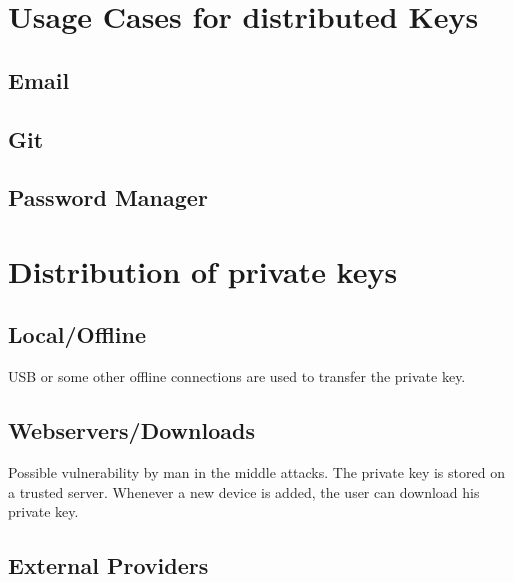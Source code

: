 \documentclass[12pt,oneside,a4paper,parskip]{scrbook}
\begin{document}
\section{Usage Cases for distributed Keys}

\subsection{Email}

\subsection{Git}

\subsection{Password Manager}



\section{Distribution of private keys}

\subsection{Local/Offline}

USB or some other offline connections are used to transfer the private key.



\subsection{Webservers/Downloads}

Possible vulnerability by man in the middle attacks.
The private key is stored on a trusted server. Whenever a new device is added, the user can download his private key.

\subsection{External Providers}
\end{document}
